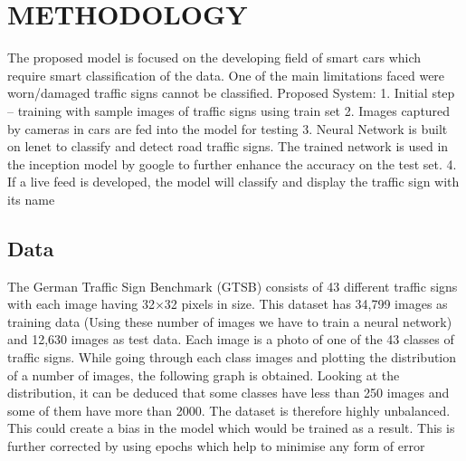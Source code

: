 \documentclass{article}
\begin{document}
\section{METHODOLOGY}
\label{sec:majhead}

The proposed model is focused on the developing field of smart cars which require smart classification of the data. One of the main limitations faced were worn/damaged traffic signs cannot be classified.
Proposed System:
1. Initial step – training with sample images of traffic signs using train set
2. Images captured by cameras in cars are fed into the model for testing
3. Neural Network is built on lenet to classify and detect road traffic signs. The trained network is used in the inception model by google to further enhance the accuracy on the test set.
4. If a live feed is developed, the model will classify and display the traffic sign with its name

\subsection{Data}
\label{ssec:subhead}

The German Traffic Sign Benchmark (GTSB) consists of 43 different traffic signs with each image having 32×32 pixels in size. This dataset has 34,799 images as training data (Using these number of images we have to train a neural network) and 12,630 images as test data. Each image is a photo of one of the 43 classes of traffic signs. While going through each class images and plotting the distribution of a number of images, the following graph is obtained. Looking at the distribution, it can be deduced that some classes have less than 250 images and some of them have more than 2000. The dataset is therefore highly unbalanced. This could create a bias in the model which would be trained as a result. This is further corrected by using epochs which help to minimise any form of error
\end{document}
